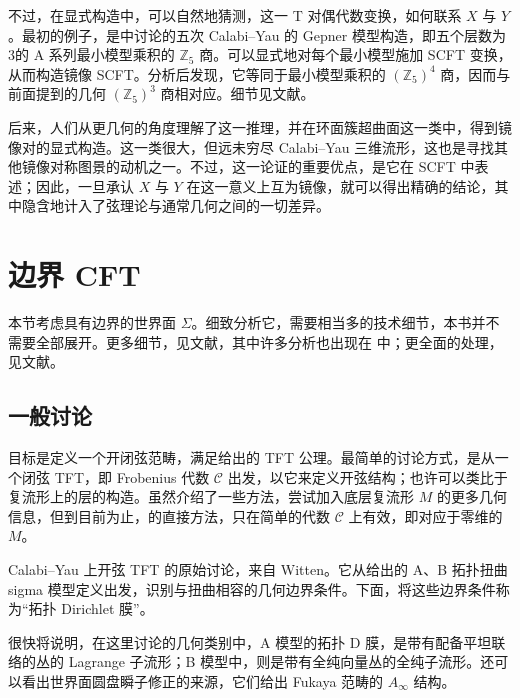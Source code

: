 不过，在显式构造中，可以自然地猜测，这一 T 对偶代数变换，如何联系 $X$ 与 $Y$。最初的例子，是中讨论的五次 Calabi--Yau 的 Gepner 模型构造，即五个层数为3的 A 系列最小模型乘积的 $\mathbb{Z}_5$ 商。可以显式地对每个最小模型施加 SCFT 变换，从而构造镜像 SCFT。分析后发现，它等同于最小模型乘积的 $(\mathbb{Z}_5)^4$ 商，因而与前面提到的几何 $(\mathbb{Z}_5)^3$ 商相对应。细节见文献。

后来，人们从更几何的角度理解了这一推理，并在环面簇超曲面这一类中，得到镜像对的显式构造。这一类很大，但远未穷尽 Calabi--Yau 三维流形，这也是寻找其他镜像对称图景的动机之一。不过，这一论证的重要优点，是它在 SCFT 中表述；因此，一旦承认 $X$ 与 $Y$ 在这一意义上互为镜像，就可以得出精确的结论，其中隐含地计入了弦理论与通常几何之间的一切差异。

\section{边界 CFT}\label{sec:3.5}

本节考虑具有边界的世界面 $\Sigma$。细致分析它，需要相当多的技术细节，本书并不需要全部展开。更多细节，见文献，其中许多分析也出现在  中；更全面的处理，见文献。

\subsection{一般讨论}\label{sec:3.5.1}

目标是定义一个开闭弦范畴，满足给出的 TFT 公理。最简单的讨论方式，是从一个闭弦 TFT，即 Frobenius 代数 $\mathcal{C}$ 出发，以它来定义开弦结构；也许可以类比于复流形上的层的构造。虽然介绍了一些方法，尝试加入底层复流形 $M$ 的更多几何信息，但到目前为止，的直接方法，只在简单的代数 $\mathcal{C}$ 上有效，即对应于零维的 $M$。

Calabi--Yau 上开弦 TFT 的原始讨论，来自 Witten。它从给出的 A、B 拓扑扭曲 sigma 模型定义出发，识别与扭曲相容的几何边界条件。下面，将这些边界条件称为“拓扑 Dirichlet 膜”。

很快将说明，在这里讨论的几何类别中，A 模型的拓扑 D 膜，是带有配备平坦联络的丛的 Lagrange 子流形；B 模型中，则是带有全纯向量丛的全纯子流形。还可以看出世界面圆盘瞬子修正的来源，它们给出 Fukaya 范畴的 $A_\infty$ 结构。

